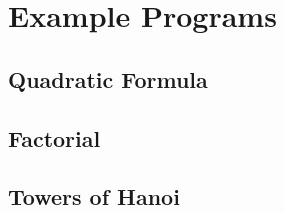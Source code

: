 \documentclass{article}
\begin{document}
    \section{Example Programs}
    
    \subsection{Quadratic Formula}
    
    
    \subsection{Factorial}
    
    
    \subsection{Towers of Hanoi}
    
    
    
\end{document}
